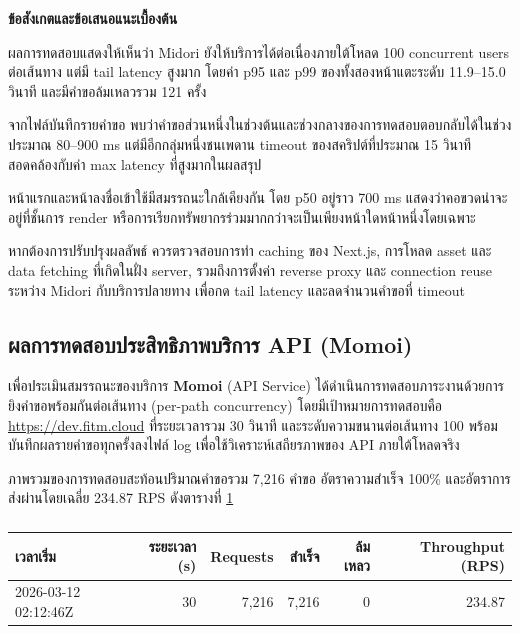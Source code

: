 \hspace*{1.3em}
\textbf{ข้อสังเกตและข้อเสนอแนะเบื้องต้น}
\begin{mycustomitem}
    \item ผลการทดสอบแสดงให้เห็นว่า Midori ยังให้บริการได้ต่อเนื่องภายใต้โหลด 100 concurrent users ต่อเส้นทาง แต่มี tail latency สูงมาก โดยค่า p95 และ p99 ของทั้งสองหน้าแตะระดับ 11.9--15.0 วินาที และมีคำขอล้มเหลวรวม 121 ครั้ง
    \item จากไฟล์บันทึกรายคำขอ พบว่าคำขอส่วนหนึ่งในช่วงต้นและช่วงกลางของการทดสอบตอบกลับได้ในช่วงประมาณ 80--900 ms แต่มีอีกกลุ่มหนึ่งชนเพดาน timeout ของสคริปต์ที่ประมาณ 15 วินาที สอดคล้องกับค่า max latency ที่สูงมากในผลสรุป
    \item หน้าแรกและหน้าลงชื่อเข้าใช้มีสมรรถนะใกล้เคียงกัน โดย p50 อยู่ราว 700 ms แสดงว่าคอขวดน่าจะอยู่ที่ชั้นการ render หรือการเรียกทรัพยากรร่วมมากกว่าจะเป็นเพียงหน้าใดหน้าหนึ่งโดยเฉพาะ
    \item หากต้องการปรับปรุงผลลัพธ์ ควรตรวจสอบการทำ caching ของ Next.js, การโหลด asset และ data fetching ที่เกิดในฝั่ง server, รวมถึงการตั้งค่า reverse proxy และ connection reuse ระหว่าง Midori กับบริการปลายทาง เพื่อกด tail latency และลดจำนวนคำขอที่ timeout
\end{mycustomitem}

\subsection{ผลการทดสอบประสิทธิภาพบริการ API (Momoi)}
\label{sec:momoi-perf}
\hspace*{1.3em}
เพื่อประเมินสมรรถนะของบริการ \textbf{Momoi} (API Service) ได้ดำเนินการทดสอบภาระงานด้วยการยิงคำขอพร้อมกันต่อเส้นทาง (per-path concurrency) โดยมีเป้าหมายการทดสอบคือ \url{https://dev.fitm.cloud} ที่ระยะเวลารวม 30 วินาที และระดับความขนานต่อเส้นทาง 100 พร้อมบันทึกผลรายคำขอทุกครั้งลงไฟล์ log เพื่อใช้วิเคราะห์เสถียรภาพของ API ภายใต้โหลดจริง

\hspace*{1.3em}
ภาพรวมของการทดสอบสะท้อนปริมาณคำขอรวม 7{,}216 คำขอ อัตราความสำเร็จ 100\% และอัตราการส่งผ่านโดยเฉลี่ย 234.87 RPS ดังตารางที่ \ref{tab:momoi-summary}

\begin{table}[htbp]
    \centering
    \caption{}
    \fontSixTeen
    \label{tab:momoi-summary}
    \begin{tabular}{lrrrrr}
        \hline
    เวลาเริ่ม & ระยะเวลา (s) & Requests & สำเร็จ & ล้มเหลว & Throughput (RPS) \\
        \hline
    2026-03-12 02:12:46Z & 30 & 7{,}216 & 7{,}216 & 0 & 234.87 \\
        \hline
    \end{tabular}
\end{table}

